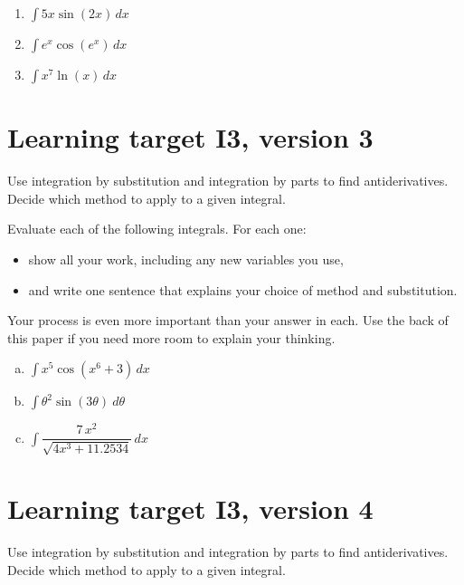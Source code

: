 \begin{enumerate}
	\item $\int 5x \sin(2x) \, dx$
			
	\vfill

	\item $\int e^x \cos(e^x) \, dx$

	\vfill

	\item $\int x^7 \ln(x) \, dx$
	\vfill
\end{enumerate}

\pagebreak
\section{Learning target I3, version 3}

Use integration by substitution and integration by parts to find antiderivatives. Decide which method to apply to a given integral.

\hrulefill

Evaluate each of the following integrals. For each one:
\begin{itemize}
	\item show all your work, including any new variables you use,
	\item and write one sentence that explains your choice of method and substitution.
\end{itemize}
Your process is even more important than your answer in each. Use the back of this paper if you need more room to explain your thinking.

\begin{enumerate}[(a)]
	\item $\int x^5 \cos(x^6 + 3) \, dx$
			
	\vfill

	\item $\int \theta^2 \sin(3\theta)\ d\theta$
	
	\vfill
	
	\item $\int \dfrac{7 \, x^{2}}{\sqrt{4x^{3} + 11.2534}} \, dx$
	\vfill
\end{enumerate}

\pagebreak
\section{Learning target I3, version 4}

Use integration by substitution and integration by parts to find antiderivatives. Decide which method to apply to a given integral.

